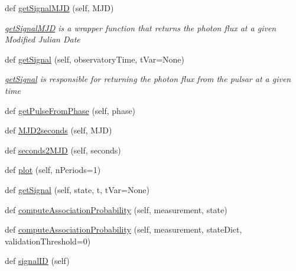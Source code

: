 \begin{DoxyCompactItemize}
def \hyperlink{classmodest_1_1signals_1_1xraysource_1_1PeriodicXRaySource_a9949b9a2d7a2ed0e4bb731e3e4fb7d2f}{get\+Signal\+M\+JD} (self, M\+JD)
\begin{DoxyCompactList}\small\item\em \hyperlink{classmodest_1_1signals_1_1xraysource_1_1PeriodicXRaySource_a9949b9a2d7a2ed0e4bb731e3e4fb7d2f}{get\+Signal\+M\+JD} is a wrapper function that returns the photon flux at a given Modified Julian Date \end{DoxyCompactList}\item 
def \hyperlink{classmodest_1_1signals_1_1xraysource_1_1PeriodicXRaySource_ad0cc325042befeb69faf9cce05457b5d}{get\+Signal} (self, observatory\+Time, t\+Var=None)
\begin{DoxyCompactList}\small\item\em \hyperlink{classmodest_1_1signals_1_1xraysource_1_1PeriodicXRaySource_ad0cc325042befeb69faf9cce05457b5d}{get\+Signal} is responsible for returning the photon flux from the pulsar at a given time \end{DoxyCompactList}\item 
def \hyperlink{classmodest_1_1signals_1_1xraysource_1_1PeriodicXRaySource_a252850e9966b3281a193c834cb687646}{get\+Pulse\+From\+Phase} (self, phase)
\item 
def \hyperlink{classmodest_1_1signals_1_1xraysource_1_1PeriodicXRaySource_abdd0337b42d16288c8ad3dede15a99f2}{M\+J\+D2seconds} (self, M\+JD)
\item 
def \hyperlink{classmodest_1_1signals_1_1xraysource_1_1PeriodicXRaySource_a023967f167c21ca3a6020eb36dd7a7d7}{seconds2\+M\+JD} (self, seconds)
\item 
def \hyperlink{classmodest_1_1signals_1_1xraysource_1_1PeriodicXRaySource_aeca7ec50ae038106569f9368523d0ab0}{plot} (self, n\+Periods=1)
\item 
def \hyperlink{classmodest_1_1signals_1_1poissonsource_1_1DynamicPoissonSource_aa6030c607a4bded71c622f5f132c9bfe}{get\+Signal} (self, state, t, t\+Var=None)
\item 
def \hyperlink{classmodest_1_1signals_1_1poissonsource_1_1DynamicPoissonSource_a086252814ef8c2ddd3f4331dcfbbb827}{compute\+Association\+Probability} (self, measurement, state)
\item 
def \hyperlink{classmodest_1_1signals_1_1signalsource_1_1SignalSource_a3d32dbed840ea9ac775b226f0a654831}{compute\+Association\+Probability} (self, measurement, state\+Dict, validation\+Threshold=0)
\item 
def \hyperlink{classmodest_1_1signals_1_1signalsource_1_1SignalSource_a9a64c6a9c2954f6ad61e4ca3518ea8ab}{signal\+ID} (self)

\end{DoxyCompactItemize}
